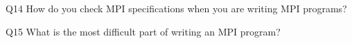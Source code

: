 \begin{description}%
\item{Q14} How do you check MPI specifications when you are writing MPI programs?%
\item{Q15} What is the most difficult part of writing an MPI program?%
\end{description}%
